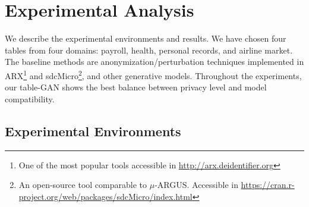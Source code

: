 \section{Experimental Analysis}
We describe the experimental environments and results. We have chosen four tables from four domains: payroll, health, personal records, and airline market. The baseline methods are anonymization\slash perturbation techniques implemented in ARX\footnote{One of the most popular tools accessible in \url{http://arx.deidentifier.org}} and sdcMicro\footnote{An open-source tool comparable to $\mu$-ARGUS. Accessible in \url{https://cran.r-project.org/web/packages/sdcMicro/index.html}}, and other generative models. Throughout the experiments, our table-GAN shows the best balance between privacy level and model compatibility.

\subsection{Experimental Environments}
